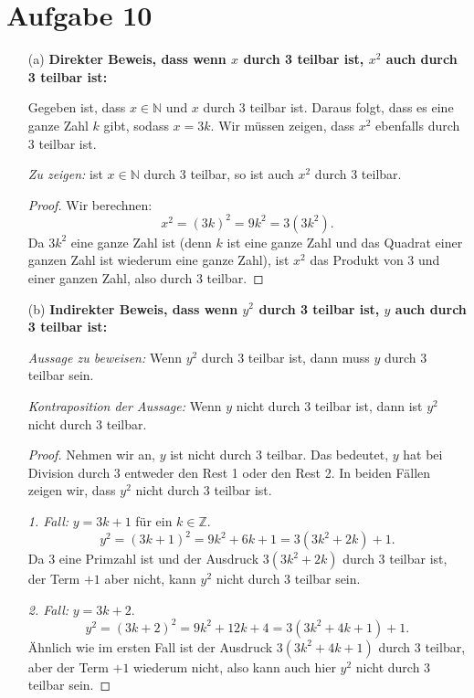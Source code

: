 \documentclass[12pt]{article}
\begin{document}
\newpage

\section*{Aufgabe 10}

\begin{itemize}
	\item[(a)] \textbf{Direkter Beweis, dass wenn \( x \) durch 3 teilbar ist, \( x^2 \) auch durch 3 teilbar ist:}
		
		Gegeben ist, dass \( x \in \mathbb{N} \) und \( x \) durch 3 teilbar ist. Daraus folgt, dass es eine ganze Zahl \( k \) gibt, sodass \( x = 3k \). Wir müssen zeigen, dass \( x^2 \) ebenfalls durch 3 teilbar ist.
		
		\textit{Zu zeigen:} ist \( x \in \mathbb{N} \) durch 3 teilbar, so ist auch \( x^2 \) durch 3 teilbar.
		
		\begin{proof}
			Wir berechnen:
			\[ x^2 = (3k)^2 = 9k^2 = 3(3k^2). \]
			Da \( 3k^2 \) eine ganze Zahl ist (denn \( k \) ist eine ganze Zahl und das Quadrat einer ganzen Zahl ist wiederum eine ganze Zahl), ist \( x^2 \) das Produkt von 3 und einer ganzen Zahl, also durch 3 teilbar.
		\end{proof}
		
	\item[(b)] \textbf{Indirekter Beweis, dass wenn \( y^{2} \) durch 3 teilbar ist, \( y \) auch durch 3 teilbar ist:}

		\textit{Aussage zu beweisen:} Wenn \( y^2 \) durch 3 teilbar ist, dann muss \( y \) durch 3 teilbar sein.

		\textit{Kontraposition der Aussage:} Wenn \( y \) nicht durch 3 teilbar ist, dann ist \( y^2 \) nicht durch 3 teilbar.

		\begin{proof}
			Nehmen wir an, \( y \) ist nicht durch 3 teilbar. Das bedeutet, \( y \) hat bei Division durch 3 entweder den Rest 1 oder den Rest 2. In beiden Fällen zeigen wir, dass \( y^2 \) nicht durch 3 teilbar ist.

			\textit{1. Fall:} \( y = 3k + 1 \) für ein \( k \in \mathbb{Z} \).
			\[ y^2 = (3k + 1)^2 = 9k^2 + 6k + 1 = 3(3k^2 + 2k) + 1. \]
			Da 3 eine Primzahl ist und der Ausdruck \( 3(3k^2 + 2k) \) durch 3 teilbar ist, der Term \( +1 \) aber nicht, kann \( y^2 \) nicht durch 3 teilbar sein.

			\textit{2. Fall:} \( y = 3k + 2 \).
			\[ y^2 = (3k + 2)^2 = 9k^2 + 12k + 4 = 3(3k^2 + 4k + 1) + 1. \]
			Ähnlich wie im ersten Fall ist der Ausdruck \( 3(3k^2 + 4k + 1) \) durch 3 teilbar, aber der Term \( +1 \) wiederum nicht, also kann auch hier \( y^2 \) nicht durch 3 teilbar sein.


\end{proof}
\end{itemize}
\end{document}
